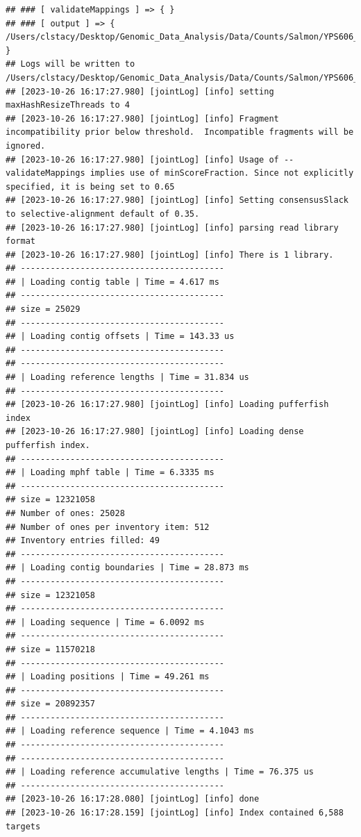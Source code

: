 \documentclass[
]{book}
\begin{document}
\begin{verbatim}
## ### [ validateMappings ] => { }
## ### [ output ] => { /Users/clstacy/Desktop/Genomic_Data_Analysis/Data/Counts/Salmon/YPS606_WT_ETOH_REP1_R1.fastq.gz_quant }
## Logs will be written to /Users/clstacy/Desktop/Genomic_Data_Analysis/Data/Counts/Salmon/YPS606_WT_ETOH_REP1_R1.fastq.gz_quant/logs
## [2023-10-26 16:17:27.980] [jointLog] [info] setting maxHashResizeThreads to 4
## [2023-10-26 16:17:27.980] [jointLog] [info] Fragment incompatibility prior below threshold.  Incompatible fragments will be ignored.
## [2023-10-26 16:17:27.980] [jointLog] [info] Usage of --validateMappings implies use of minScoreFraction. Since not explicitly specified, it is being set to 0.65
## [2023-10-26 16:17:27.980] [jointLog] [info] Setting consensusSlack to selective-alignment default of 0.35.
## [2023-10-26 16:17:27.980] [jointLog] [info] parsing read library format
## [2023-10-26 16:17:27.980] [jointLog] [info] There is 1 library.
## -----------------------------------------
## | Loading contig table | Time = 4.617 ms
## -----------------------------------------
## size = 25029
## -----------------------------------------
## | Loading contig offsets | Time = 143.33 us
## -----------------------------------------
## -----------------------------------------
## | Loading reference lengths | Time = 31.834 us
## -----------------------------------------
## [2023-10-26 16:17:27.980] [jointLog] [info] Loading pufferfish index
## [2023-10-26 16:17:27.980] [jointLog] [info] Loading dense pufferfish index.
## -----------------------------------------
## | Loading mphf table | Time = 6.3335 ms
## -----------------------------------------
## size = 12321058
## Number of ones: 25028
## Number of ones per inventory item: 512
## Inventory entries filled: 49
## -----------------------------------------
## | Loading contig boundaries | Time = 28.873 ms
## -----------------------------------------
## size = 12321058
## -----------------------------------------
## | Loading sequence | Time = 6.0092 ms
## -----------------------------------------
## size = 11570218
## -----------------------------------------
## | Loading positions | Time = 49.261 ms
## -----------------------------------------
## size = 20892357
## -----------------------------------------
## | Loading reference sequence | Time = 4.1043 ms
## -----------------------------------------
## -----------------------------------------
## | Loading reference accumulative lengths | Time = 76.375 us
## -----------------------------------------
## [2023-10-26 16:17:28.080] [jointLog] [info] done
## [2023-10-26 16:17:28.159] [jointLog] [info] Index contained 6,588 targets

\end{verbatim}
\end{document}

